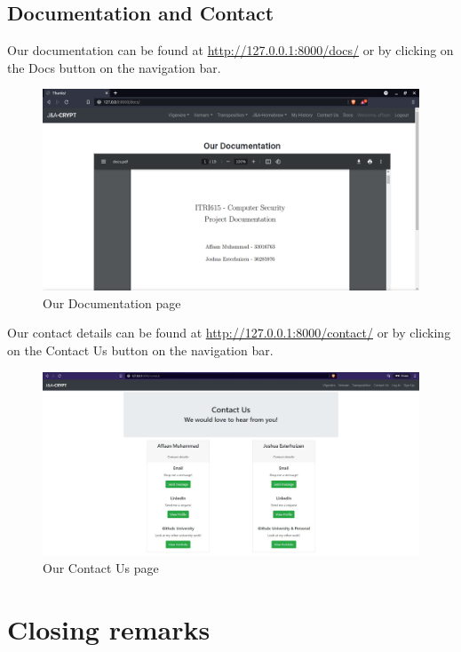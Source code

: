 \documentclass[a4paper, 12pt, titlepage]{report}
\begin{document}
\section{Documentation and Contact}
Our documentation can be found at \url{http://127.0.0.1:8000/docs/} or by clicking on the Docs button on the navigation bar.
\begin{figure}[H]
\centering
\includegraphics[scale=0.3]{./pics/docs}
\caption{Our Documentation page}
\end{figure}
Our contact details can be found at \url{http://127.0.0.1:8000/contact/} or by clicking on the Contact Us button on the navigation bar.
\begin{figure}[H]
\centering
\includegraphics[scale=0.3]{./pics/contact}
\caption{Our Contact Us page}
\end{figure}
\chapter{Closing remarks}
\end{document}

